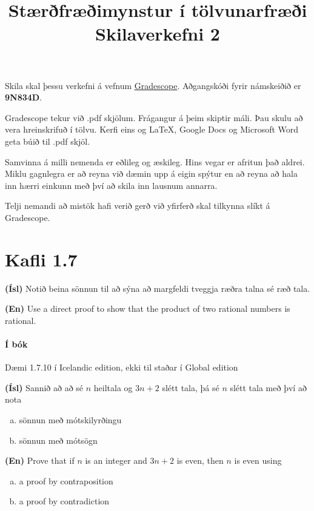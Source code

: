 \documentclass{article}
\title{Stærðfræðimynstur í tölvunarfræði \\ Skilaverkefni 2}
\author{}
\begin{document}
\maketitle

Skila skal þessu verkefni á vefnum \href{https://gradescope.com/courses/9487}{Gradescope}. Aðgangskóði fyrir námskeiðið er \textbf{9N834D}.

Gradescope tekur við .pdf skjölum. Frágangur á þeim skiptir máli. Þau skulu að vera hreinskrifuð í tölvu. Kerfi eins og \LaTeX, Google Docs og Microsoft Word geta búið til .pdf skjöl.

Samvinna á milli nemenda er eðlileg og æskileg. Hins vegar er afritun það aldrei. Miklu gagnlegra er að reyna við dæmin upp á eigin spýtur en að reyna að hala inn hærri einkunn með því að skila inn lausnum annarra.

Telji nemandi að mistök hafi verið gerð við yfirferð skal tilkynna slíkt á Gradescope.

\section{Kafli 1.7}

\question

\textbf{(Ísl)} Notið beina sönnun til að sýna að margfeldi tveggja ræðra talna sé ræð tala.

\textbf{(En)} Use a direct proof to show that the product of two rational numbers is rational.

\paragraph{Í bók} Dæmi 1.7.10 í Icelandic edition, ekki til staðar í Global edition

\question 

\textbf{(Ísl)} Sannið að að sé $n$ heiltala og $3n+2$ slétt tala, þá sé $n$ slétt tala með því að nota

\begin{enumerate}[a)]
    \item sönnun með mótskilyrðingu
    \item sönnun með mótsögn
\end{enumerate}

\textbf{(En)} Prove that if $n$ is an integer and $3n+2$ is even, then $n$ is even using

\begin{enumerate}[a)]
    \item a proof by contraposition
    \item a proof by contradiction
\end{enumerate}
\end{document}

